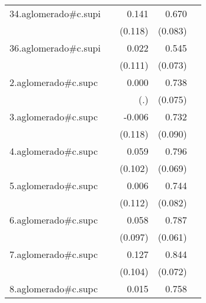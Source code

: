 {\begin{longtable}{l*{4}{D{.}{.}{-1}}}
\addlinespace
34.aglomerado#c.supi&                     &       0.141         &       0.670\sym{***}&                     \\
            &                     &     (0.118)         &     (0.083)         &                     \\
\addlinespace
36.aglomerado#c.supi&                     &       0.022         &       0.545\sym{***}&                     \\
            &                     &     (0.111)         &     (0.073)         &                     \\
\addlinespace
2.aglomerado#c.supc&                     &       0.000         &       0.738\sym{***}&                     \\
            &                     &         (.)         &     (0.075)         &                     \\
\addlinespace
3.aglomerado#c.supc&                     &      -0.006         &       0.732\sym{***}&                     \\
            &                     &     (0.118)         &     (0.090)         &                     \\
\addlinespace
4.aglomerado#c.supc&                     &       0.059         &       0.796\sym{***}&                     \\
            &                     &     (0.102)         &     (0.069)         &                     \\
\addlinespace
5.aglomerado#c.supc&                     &       0.006         &       0.744\sym{***}&                     \\
            &                     &     (0.112)         &     (0.082)         &                     \\
\addlinespace
6.aglomerado#c.supc&                     &       0.058         &       0.787\sym{***}&                     \\
            &                     &     (0.097)         &     (0.061)         &                     \\
\addlinespace
7.aglomerado#c.supc&                     &       0.127         &       0.844\sym{***}&                     \\
            &                     &     (0.104)         &     (0.072)         &                     \\
\addlinespace
8.aglomerado#c.supc&                     &       0.015         &       0.758\sym{***}&                     \\

\end{longtable}}
